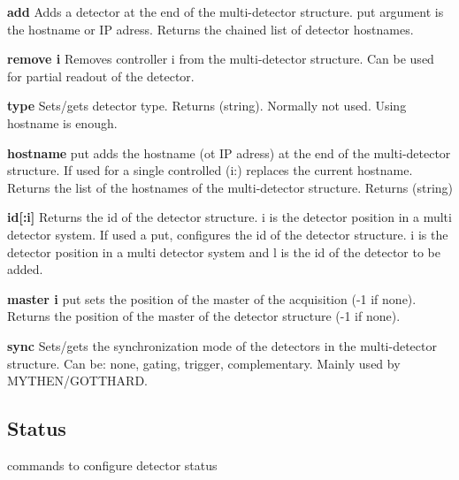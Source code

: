 \begin{DoxyItemize}
\item {\bfseries add} Adds a detector at the end of the multi-\/detector structure. {\ttfamily put} argument is the hostname or IP adress. Returns the chained list of detector hostnames.
\end{DoxyItemize}


\begin{DoxyItemize}
\item {\bfseries remove i} Removes controller {\ttfamily i} from the multi-\/detector structure. Can be used for partial readout of the detector.
\end{DoxyItemize}


\begin{DoxyItemize}
\item {\bfseries type} Sets/gets detector type. {\ttfamily Returns} {\ttfamily }(string). Normally not used. Using hostname is enough.
\end{DoxyItemize}


\begin{DoxyItemize}
\item {\bfseries hostname} {\ttfamily put} adds the hostname (ot IP adress) at the end of the multi-\/detector structure. If used for a single controlled (i:) replaces the current hostname. Returns the list of the hostnames of the multi-\/detector structure. {\ttfamily Returns} {\ttfamily }(string)
\end{DoxyItemize}


\begin{DoxyItemize}
\item {\bfseries id\mbox{[}:i\mbox{]}} Returns the id of the detector structure. i is the detector position in a multi detector system. If used a {\ttfamily put}, configures the id of the detector structure. i is the detector position in a multi detector system and l is the id of the detector to be added.
\end{DoxyItemize}


\begin{DoxyItemize}
\item {\bfseries master i} {\ttfamily put} sets the position of the master of the acquisition (-\/1 if none). Returns the position of the master of the detector structure (-\/1 if none).
\end{DoxyItemize}


\begin{DoxyItemize}
\item {\bfseries sync} Sets/gets the synchronization mode of the detectors in the multi-\/detector structure. Can be: {\ttfamily none}, {\ttfamily gating}, {\ttfamily trigger}, {\ttfamily complementary}. Mainly used by MYTHEN/GOTTHARD.
\end{DoxyItemize}\hypertarget{config_configstatus}{}\subsection{Status}\label{config_configstatus}
commands to configure detector status


